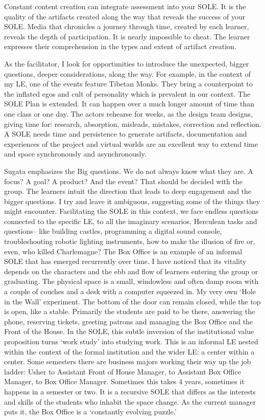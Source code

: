Constant content creation can integrate assessment into your SOLE. It is
the quality of the artifacts created along the way that reveals the
success of your SOLE. Media that chronicles a journey through time,
created by each learner, reveals the depth of participation. It is
nearly impossible to cheat. The learner expresses their comprehension in
the types and extent of artifact creation.

As the facilitator, I look for opportunities to introduce the
unexpected, bigger questions, deeper considerations, along the way. For
example, in the context of my LE, one of the events feature Tibetan
Monks. They bring a counterpoint to the inflated egos and cult of
personality which is prevalent in our context. The SOLE Plan is
extended. It can happen over a much longer amount of time than one class
or one day. The actors rehearse for weeks, as the design team designs,
giving time for: research, absorption, misleads, mistakes, correction
and reflection. A SOLE needs time and persistence to generate artifacts,
documentation and experiences of the project and virtual worlds are an
excellent way to extend time and space synchronously and asynchronously.

Sugata emphasizes the Big questions. We do not always know what they
are. A focus? A goal? A product? And the event? That should be decided
with the group. The learners intuit the direction that leads to deep
engagement and the bigger questions. I try and leave it ambiguous,
suggesting some of the things they might encounter. Facilitating the
SOLE in this context, we face endless questions connected to the
specific LE, to all the imaginary scenarios, Herculean tasks and
questions-- like building castles, programming a digital sound console,
troubleshooting robotic lighting instruments, how to make the illusion
of fire or, even, who killed Charlemagne? The Box Office is an example
of an informal SOLE that has emerged recurrently over time. I have
noticed that its vitality depends on the characters and the ebb and flow
of learners entering the group or graduating. The physical space is a
small, windowless and often damp room with a couple of couches and a
desk with a computer squeezed in. My very own `Hole in the Wall'
experiment. The bottom of the door can remain closed, while the top is
open, like a stable. Primarily the students are paid to be there,
answering the phone, reserving tickets, greeting patrons and managing
the Box Office and the Front of the House. In the SOLE, this subtle
inversion of the institutional value proposition turns `work study' into
studying work. This is an informal LE nested within the context of the
formal institution and the wider LE: a center within a center. Some
semesters there are business majors working their way up the job ladder:
Usher to Assistant Front of House Manager, to Assistant Box Office
Manager, to Box Office Manager. Sometimes this takes 4 years, sometimes
it happens in a semester or two. It is a recursive SOLE that differs as
the interests and skills of the students who inhabit the space change.
As the current manager puts it, the Box Office is a `constantly evolving
puzzle.'

